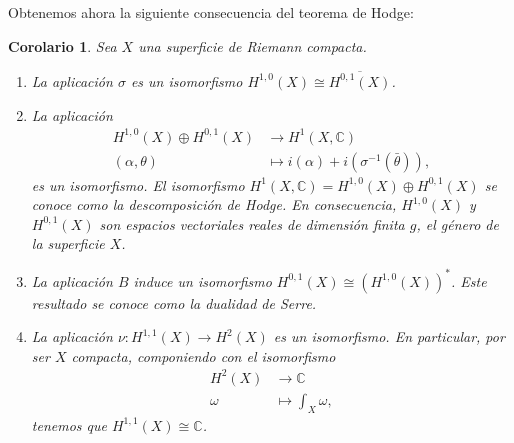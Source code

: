 \documentclass[autocontact]{gaceta}
\newtheorem{corol}[thm]{Corolario}
\theoremstyle{definition} \newtheorem{defn}[thm]{Definición}
\theoremstyle{definition} \newtheorem{ejemplo}[thm]{Ejemplo}
\theoremstyle{definition} \newtheorem{ejercicio}[thm]{Ejercicio}
\def\CC{\mathbb{C}}
\begin{document}
      Obtenemos ahora la siguiente consecuencia del teorema de Hodge:
      \begin{corol}
	Sea $X$ una superficie de Riemann compacta.
	\begin{enumerate}
	  \item La aplicación $\sigma$ es un isomorfismo $H^{1,0}(X) \cong \overline{H^{0,1}(X)}$.
	  \item La aplicación
	    \begin{align*}
	      H^{1,0}(X) \oplus H^{0,1}(X)&\longrightarrow H^1(X,\CC)\\ 
	      (\alpha,\theta) &\longmapsto i(\alpha) + i(\sigma^{-1}(\bar{\theta})), 
	      \end{align*}
	      es un isomorfismo. El isomorfismo $H^1(X,\CC)=H^{1,0}(X) \oplus H^{0,1}(X)$ se conoce como la \emph{descomposición de Hodge}. En consecuencia, $H^{1,0}(X)$ y $H^{0,1}(X)$ son espacios vectoriales reales de dimensión finita $g$, el género de la superficie $X$.
	  \item La aplicación $B$ induce un isomorfismo  $H^{0,1}(X) \cong (H^{1,0}(X))^*$. Este resultado se conoce como la \emph{dualidad de Serre}.
	    \item La aplicación $\nu:H^{1,1}(X) \rightarrow H^2(X)$ es un isomorfismo. En particular, por ser $X$ compacta, componiendo con el isomorfismo
	      \begin{align*}
		 H^2(X)&\longrightarrow \CC \\ 
		  \omega &\longmapsto  \int_X \omega,
		\end{align*}
		tenemos que $H^{1,1}(X)\cong \CC$.
	\end{enumerate}
      \end{corol}
\end{document}
